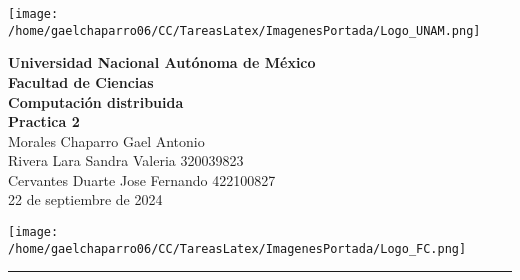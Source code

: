 
\begin{center}
    \begin{minipage}{3cm}
    	\begin{center}
    		\texttt{[image: /home/gaelchaparro06/CC/TareasLatex/ImagenesPortada/Logo\_UNAM.png]}
    	\end{center}
    \end{minipage}\hfill
    \begin{minipage}{10cm}
    	\begin{center}
    	\textbf{\large Universidad Nacional Autónoma de México}\\[0.1cm]
        \textbf{Facultad de Ciencias}\\[0.1cm]
        \textbf{Computación distribuida}\\[0.1cm]
        \textbf{Practica 2}\\[0.1cm]
        Morales Chaparro Gael Antonio\\[0.1cm]
        Rivera Lara Sandra Valeria 320039823\\[0.1cm]
        Cervantes Duarte Jose Fernando   422100827\\[0.1cm]
       22 de septiembre de 2024
    	\end{center}
    \end{minipage}\hfill
    \begin{minipage}{3cm}
    	\begin{center}
    		\texttt{[image: /home/gaelchaparro06/CC/TareasLatex/ImagenesPortada/Logo\_FC.png]}
    	\end{center}
    \end{minipage}
\end{center}

\rule{17cm}{0.1mm}

